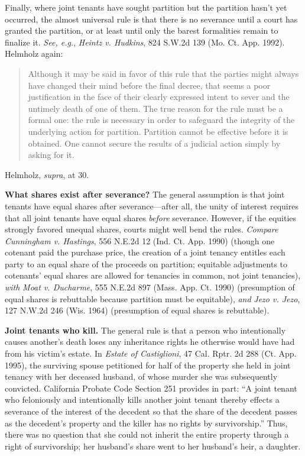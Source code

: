 Finally, where joint tenants have sought partition but the partition hasn't yet
occurred, the almost universal rule is that there is no severance until a court
has granted the partition, or at least until only the barest formalities remain
to finalize it. \textit{See, e.g.}, \emph{Heintz v. Hudkins}, 824 S.W.2d 139
(Mo. Ct. App. 1992). Helmholz again:
\begin{quote}
Although it may be said in favor of this rule that the parties might always have
changed their mind before the final decree, that seems a poor justification in
the face of their clearly expressed intent to sever and the untimely death of
one of them. The true reason for the rule must be a formal one: the rule is
necessary in order to safeguard the integrity of the underlying action for
partition. Partition cannot be effective before it is obtained. One cannot
secure the results of a judicial action simply by asking for it.
\end{quote}
Helmholz, \textit{supra}, at 30.


\item \textbf{What shares exist after severance?} The general assumption is that
joint tenants have equal shares after severance---after all, the unity of
interest requires that all joint tenants have equal shares \textit{before}
severance. However, if the equities strongly favored unequal shares, courts
might well bend the rules. \textit{Compare} \emph{Cunningham v. Hastings}, 556
N.E.2d 12 (Ind. Ct. App. 1990) (though one cotenant paid the purchase price, the
creation of a joint tenancy entitles each party to an equal share of the
proceeds on partition; equitable adjustments to cotenants' equal shares are
allowed for tenancies in common, not joint tenancies), \textit{with} \emph{Moat
v. Ducharme}, 555 N.E.2d 897 (Mass. App. Ct. 1990) (presumption of equal shares
is rebuttable because partition must be equitable), \textit{and} \emph{Jezo v.
Jezo}, 127 N.W.2d 246 (Wis. 1964) (presumption of equal shares is rebuttable).


\item \textbf{Joint tenants who kill.} The general rule is that a person who
intentionally causes another's death loses any inheritance rights he otherwise
would have had from his victim's estate. In \textit{Estate of Castiglioni}, 47
Cal. Rptr. 2d 288 (Ct. App. 1995), the surviving spouse petitioned for half of
the property she held in joint tenancy with her deceased husband, of whose
murder she was subsequently convicted. California Probate Code Section 251
provides in part: ``A joint tenant who feloniously and intentionally kills
another joint tenant thereby effects a severance of the interest of the
decedent so that the share of the decedent passes as the decedent's property
and the killer has no rights by survivorship.'' Thus, there was no question
that she could not inherit the entire property through a right of survivorship;
her husband's share went to her husband's heir, a daughter.


